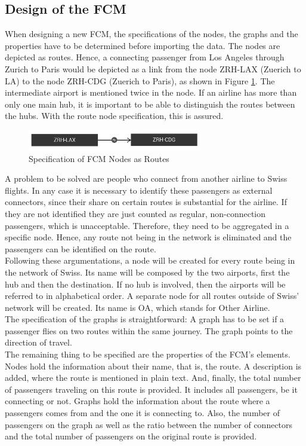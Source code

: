 \documentclass[conference]{IEEEtran}
\begin{document}
\subsection{Design of the FCM}
When designing a new FCM, the specifications of the nodes, the graphs and the properties have to be determined before importing the data. The nodes are depicted as routes. Hence, a connecting passenger from Los Angeles through Zurich to Paris would be depicted as a link from the node ZRH-LAX (Zuerich to LA) to the node ZRH-CDG (Zuerich to Paris), as shown in Figure \ref{fig:noderoute}. The intermediate airport is mentioned twice in the node. If an airline has more than only one main hub, it is important to be able to distinguish the routes between the hubs. With the route node specification, this is assured.
\begin{figure}[h]
\includegraphics[width=3in]{img/route.png}
\caption{Specification of FCM Nodes as Routes}
\label{fig:noderoute}
\end{figure}
A problem to be solved are people who connect from another airline to Swiss flights. In any case it is necessary to identify these passengers as external connectors, since their share on certain routes is substantial for the airline. If they are not identified they are just counted as regular, non-connection passengers, which is unacceptable. Therefore, they need to be aggregated in a specific node. Hence, any route not being in the network is eliminated and the passengers can be identified on the route.\\
Following these argumentations, a node will be created for every route being in the network of Swiss. Its name will be composed by the two airports, first the hub and then the destination. If no hub is involved, then the airports will be referred to in alphabetical order. A separate node for all routes outside of Swiss' network will be created. Its name is OA, which stands for Other Airline.\\
The specification of the graphs is straightforward: A graph has to be set if a passenger flies on two routes within the same journey. The graph points to the direction of travel.\\
The remaining thing to be specified are the properties of the FCM's elements. Nodes hold the information about their name, that is, the route. A description is added, where the route is mentioned in plain text. And, finally, the total number of passengers traveling on this route is provided. It includes all passengers, be it connecting or not. Graphs hold the information about the route where a passengers comes from and the one it is connecting to. Also, the number of passengers on the graph as well as the ratio between the number of connectors and the total number of passengers on the original route is provided.\\
\end{document}
